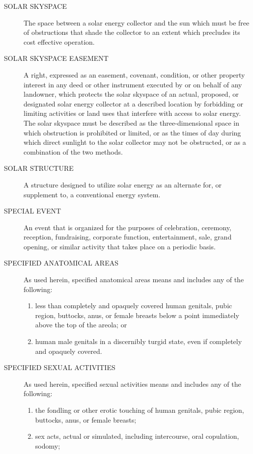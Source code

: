 \begin{description}
    \item[SOLAR SKYSPACE] The space between a solar energy collector and the sun which must be free of obstructions that shade the collector to an extent which precludes its cost effective operation.
    \item[SOLAR SKYSPACE EASEMENT] A right, expressed as an easement, covenant, condition, or other property interest in any deed or other instrument executed by or on behalf of any landowner, which protects the solar skyspace of an actual, proposed, or designated solar energy collector at a described location by forbidding or limiting activities or land uses that interfere with access to solar energy. The solar skyspace must be described as the three-dimensional space in which obstruction is prohibited or limited, or as the times of day during which direct sunlight to the solar collector may not be obstructed, or as a combination of the two methods.
    \item[SOLAR STRUCTURE] A structure designed to utilize solar energy as an alternate for, or supplement to, a conventional energy system.
    \item[SPECIAL EVENT] An event that is organized for the purposes of celebration, ceremony, reception, fundraising, corporate function, entertainment, sale, grand opening, or similar activity that takes place on a periodic basis.
    \item[SPECIFIED ANATOMICAL AREAS] As used herein, specified anatomical areas means and includes any of the following:
        \begin{enumerate}[{\indent}1)]
            \item less than completely and opaquely covered human genitals, pubic region, buttocks, anus, or female breasts below a point immediately above the top of the areola; or
            \item human male genitals in a discernibly turgid state, even if completely and opaquely covered.
        \end{enumerate}
    \item[SPECIFIED SEXUAL ACTIVITIES] As used herein, specified sexual activities means and includes any of the following:
        \begin{enumerate}[{\indent}1)]
            \item the fondling or other erotic touching of human genitals, pubic region, buttocks, anus, or female breasts;
            \item sex acts, actual or simulated, including intercourse, oral copulation, sodomy;

\end{enumerate}
\end{description}
